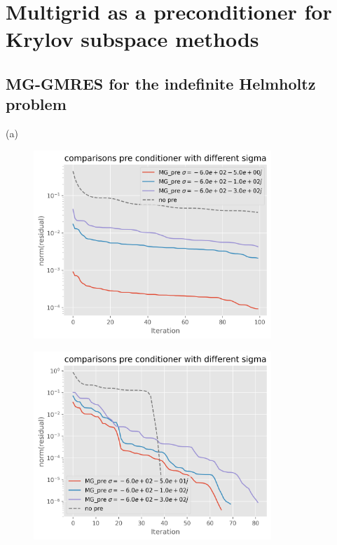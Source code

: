 \documentclass[a4paper,12pt]{article}
\begin{document}
\section{Multigrid as a preconditioner for Krylov subspace methods}

\subsection{MG-GMRES for the indefinite Helmholtz problem}
(a) \\
\begin{figure}[h!]
    \centering
    \includegraphics[width=0.8\textwidth]{../code/plts/convergence_gmres_pointsource.png}
    \caption{}
    \label{fig:convergence gmres pointsource}
\end{figure}

\begin{figure}[h!]
    \centering
    \includegraphics[width=0.8\textwidth]{../code/plts/convergence_gmres_wave_basis2.png}
    \caption{}
    \label{fig:convergence gmres wavebasis 2}
\end{figure}
\end{document}
